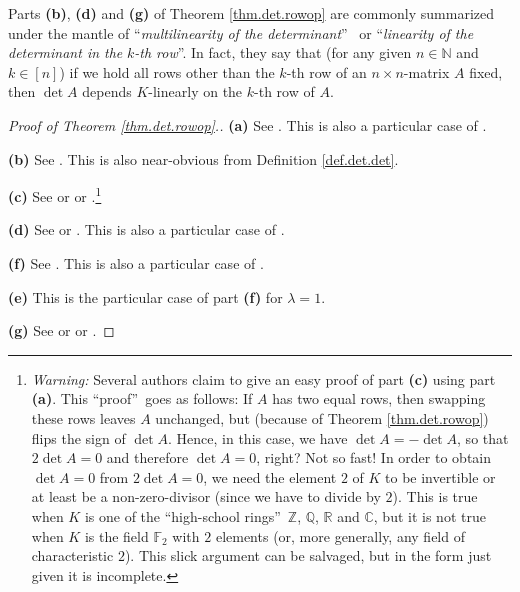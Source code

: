 Parts \textbf{(b)}, \textbf{(d)} and \textbf{(g)} of Theorem
\ref{thm.det.rowop} are commonly summarized under the mantle of
\textquotedblleft\emph{multilinearity of the determinant}\textquotedblright%
\ or \textquotedblleft\emph{linearity of the determinant in the }$k$\emph{-th
row}\textquotedblright. In fact, they say that (for any given $n\in\mathbb{N}$
and $k\in\left[  n\right]  $) if we hold all rows other than the $k$-th row of
an $n\times n$-matrix $A$ fixed, then $\det A$ depends $K$-linearly on the
$k$-th row of $A$.

\begin{proof}
[Proof of Theorem \ref{thm.det.rowop}.]\textbf{(a)} See \cite[Exercise 6.7
\textbf{(a)}]{detnotes}. This is also a particular case of \cite[Corollary
B.19]{Strick13}.

\textbf{(b)} See \cite[Exercise 6.7 \textbf{(c)}]{detnotes}. This is also
near-obvious from Definition \ref{def.det.det}.

\textbf{(c)} See \cite[Exercise 6.7 \textbf{(e)}]{detnotes} or \cite[\S 5.3.3,
property (iii)]{Laue-det} or \cite[2019-10-23 blackboard notes, Theorem
1.3.3]{19fla}.\footnote{\textit{Warning:} Several authors claim to give an
easy proof of part \textbf{(c)} using part \textbf{(a)}. This
\textquotedblleft proof\textquotedblright\ goes as follows: If $A$ has two
equal rows, then swapping these rows leaves $A$ unchanged, but (because of
Theorem \ref{thm.det.rowop}) flips the sign of $\det A$. Hence, in this case,
we have $\det A=-\det A$, so that $2\det A=0$ and therefore $\det A=0$, right?
Not so fast! In order to obtain $\det A=0$ from $2\det A=0$, we need the
element $2$ of $K$ to be invertible or at least be a non-zero-divisor (since
we have to divide by $2$). This is true when $K$ is one of the
\textquotedblleft high-school rings\textquotedblright\ $\mathbb{Z}$,
$\mathbb{Q}$, $\mathbb{R}$ and $\mathbb{C}$, but it is not true when $K$ is
the field $\mathbb{F}_{2}$ with $2$ elements (or, more generally, any field of
characteristic $2$). This slick argument can be salvaged, but in the form just
given it is incomplete.}

\textbf{(d)} See \cite[Exercise 6.7 \textbf{(g)}]{detnotes} or \cite[\S 5.3.3,
property (ii)]{Laue-det}. This is also a particular case of \cite[Corollary
B.19]{Strick13}.

\textbf{(f)} See \cite[Exercise 6.8 \textbf{(a)}]{detnotes}. This is also a
particular case of \cite[Corollary B.19]{Strick13}.

\textbf{(e)} This is the particular case of part \textbf{(f)} for $\lambda=1$.

\textbf{(g)} See \cite[Exercise 6.7 \textbf{(i)}]{detnotes} or \cite[\S 5.3.3,
property (i)]{Laue-det} or \cite[2019-10-30 blackboard notes, Theorem
1.2.3]{19fla}.
\end{proof}

